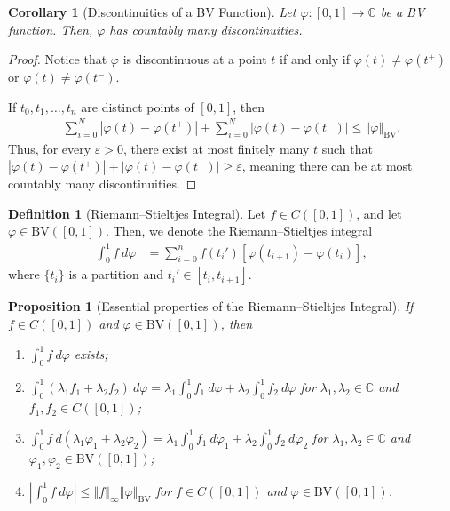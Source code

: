 \documentclass[12pt]{extarticle}
\newcommand{\C}{\mathbb{C}}
\newcommand{\norm}[1]{\left\Vert #1\right\Vert}
\newcommand{\ve}{\varepsilon}
\theoremstyle{plain}
\newtheorem*{corollary}{Corollary}
\newtheorem*{proposition}{Proposition}
\theoremstyle{definition}
\newtheorem*{definition}{Definition}
\theoremstyle{note}
\renewcommand{\newline}{\hfill\break}
\begin{document}
\begin{corollary}[Discontinuities of a BV Function]
  Let $\varphi: [0,1]\rightarrow \C$ be a BV function. Then, $\varphi$ has countably many discontinuities.
\end{corollary}
\begin{proof}
  Notice that $\varphi$ is discontinuous at a point $t$ if and only if $\varphi(t) \neq \varphi\left(t^{+}\right)$ or $\varphi(t) \neq \varphi\left(t^{-}\right)$.\newline

  If $t_0,t_1,\dots,t_n$ are distinct points of $[0,1]$, then
  \begin{align*}
    \sum_{i=0}^{N}\left\vert \varphi(t) - \varphi(t^{+}) \right\vert + \sum_{i=0}^{N}\left\vert \varphi(t) - \varphi(t^{-}) \right\vert \leq \norm{\varphi}_{\text{BV}}.
  \end{align*}
  Thus, for every $\ve > 0$, there exist at most finitely many $t$ such that $\left\vert \varphi(t) - \varphi\left(t^{+}\right) \right\vert + \left\vert \varphi(t) - \varphi(t^{-}) \right\vert \geq \ve$, meaning there can be at most countably many discontinuities.
\end{proof}
\begin{definition}[Riemann--Stieltjes Integral]
  Let $f\in C([0,1])$, and let $\varphi \in \text{BV}\left([0,1]\right)$. Then, we denote the Riemann--Stieltjes integral
  \begin{align*}
    \int_{0}^{1}f\:d\varphi &= \sum_{i=0}^{n}f\left(t_i'\right)\left[\varphi\left(t_{i+1}\right) - \varphi\left(t_i\right)\right],
  \end{align*}
  where $\{t_i\}$ is a partition and $t_i'\in [t_i,t_{i+1}]$.
\end{definition}
\begin{proposition}[Essential properties of the Riemann--Stieltjes Integral]
  If $f\in C([0,1])$ and $\varphi\in \text{BV}\left([0,1]\right)$, then
  \begin{enumerate}[(1)]
    \item $\displaystyle \int_{0}^{1} f\:d\varphi$ exists;
    \item $\displaystyle \int_{0}^{1} \left(\lambda_1f_1 + \lambda_2f_2\right)\:d\varphi = \lambda_1 \int_{0}^{1} f_1\:d\varphi + \lambda_2 \int_{0}^{1} f_2\:d\varphi$ for $\lambda_1,\lambda_2\in \C$ and $f_1,f_2 \in C([0,1])$;
    \item $\displaystyle \int_{0}^{1} f\:d\left(\lambda_1\varphi_1 + \lambda_2\varphi_2\right) = \lambda_1\int_{0}^{1} f_1\:d\varphi_1 + \lambda_2 \int_{0}^{1} f_2\:d\varphi_2$ for $\lambda_1,\lambda_2\in \C$ and $\varphi_1,\varphi_2\in \text{BV}\left([0,1]\right)$;
    \item $\displaystyle \left\vert \int_{0}^{1} f\:d\varphi \right\vert \leq \norm{f}_{\infty}\norm{\varphi}_{\text{BV}}$ for $f\in C\left([0,1]\right)$ and $\varphi \in \text{BV}\left([0,1]\right)$.
  \end{enumerate}
\end{proposition}
\end{document}
